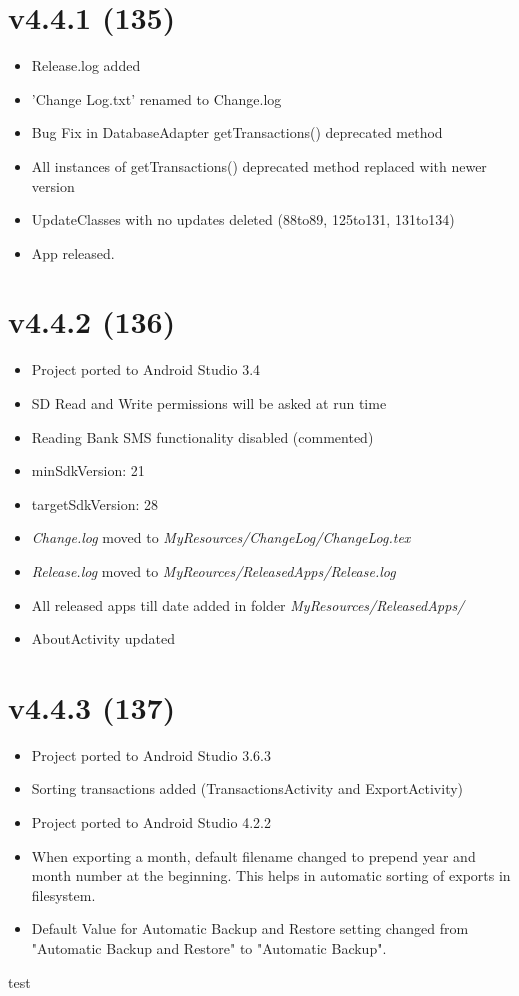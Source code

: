 \documentclass{article}
\begin{document}
    \section{v4.4.1 (135)}\label{sec:135}
    \begin{itemize}
        \item Release.log added
        \item 'Change Log.txt' renamed to Change.log
        \item Bug Fix in DatabaseAdapter getTransactions() deprecated method
        \item All instances of getTransactions() deprecated method replaced with newer version
        \item UpdateClasses with no updates deleted (88to89, 125to131, 131to134)
        \item App released.
    \end{itemize}

    \section{v4.4.2 (136)}\label{sec:136}
    \begin{itemize}
        \item Project ported to Android Studio 3.4
        \item SD Read and Write permissions will be asked at run time
        \item Reading Bank SMS functionality disabled (commented)
        \item minSdkVersion: 21
        \item targetSdkVersion: 28
        \item \textit{Change.log} moved to \textit{MyResources/ChangeLog/ChangeLog.tex}
        \item \textit{Release.log} moved to \textit{MyReources/ReleasedApps/Release.log}
        \item All released apps till date added in folder \textit{MyResources/ReleasedApps/}
        \item AboutActivity updated
    \end{itemize}


    \section{v4.4.3 (137)}\label{sec:137}
    \begin{itemize}
        \item Project ported to Android Studio 3.6.3
        \item Sorting transactions added (TransactionsActivity and ExportActivity)
        \item Project ported to Android Studio 4.2.2
        \item When exporting a month, default filename changed to prepend year and month number at the beginning.
        This helps in automatic sorting of exports in filesystem.
        \item Default Value for Automatic Backup and Restore setting changed from "Automatic Backup and Restore" to "Automatic Backup".
    \end{itemize}

    test
\end{document}
